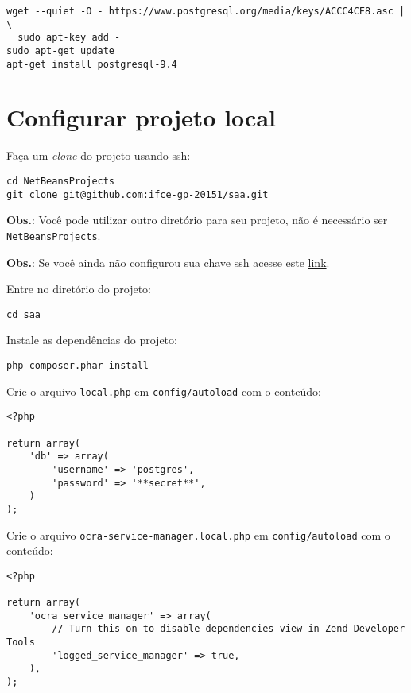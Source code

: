\begin{verbatim}
wget --quiet -O - https://www.postgresql.org/media/keys/ACCC4CF8.asc | \
  sudo apt-key add -
sudo apt-get update
apt-get install postgresql-9.4
\end{verbatim}

\section{Configurar projeto local}\label{configurar-projeto-local}

Faça um \emph{clone} do projeto usando ssh:

\begin{verbatim}
cd NetBeansProjects
git clone git@github.com:ifce-gp-20151/saa.git
\end{verbatim}

\textbf{Obs.}: Você pode utilizar outro diretório para seu projeto, não
é necessário ser \texttt{NetBeansProjects}.

\textbf{Obs.}: Se você ainda não configurou sua chave ssh acesse este
\href{https://help.github.com/articles/generating-ssh-keys/}{link}.

Entre no diretório do projeto:

\begin{verbatim}
cd saa
\end{verbatim}

Instale as dependências do projeto:

\begin{verbatim}
php composer.phar install
\end{verbatim}

Crie o arquivo \texttt{local.php} em \texttt{config/autoload} com o
conteúdo:

\begin{verbatim}
<?php

return array(
    'db' => array(
        'username' => 'postgres',
        'password' => '**secret**',
    )
);
\end{verbatim}

Crie o arquivo \texttt{ocra-service-manager.local.php} em
\texttt{config/autoload} com o conteúdo:

\begin{verbatim}
<?php

return array(
    'ocra_service_manager' => array(
        // Turn this on to disable dependencies view in Zend Developer Tools
        'logged_service_manager' => true,
    ),
);
\end{verbatim}


